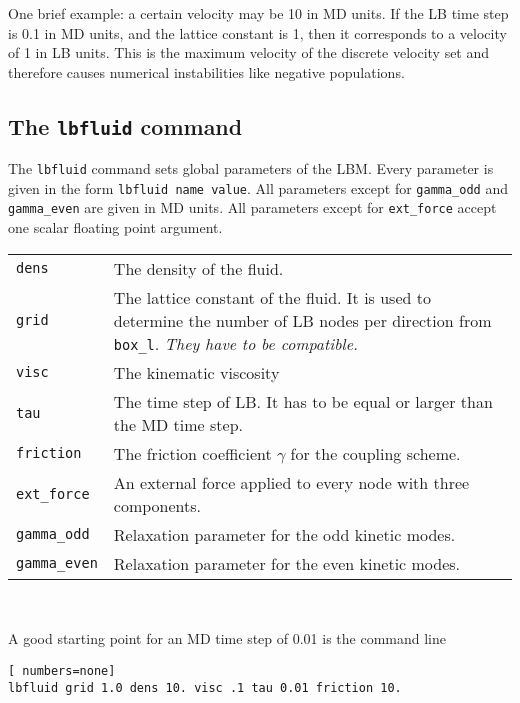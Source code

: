 One brief example: a certain velocity may be 10 in MD units.
If the LB time step is 0.1 in MD units, and the lattice constant
is 1, then it corresponds to a velocity of 1 in LB units. 
This is the maximum velocity of the discrete velocity set and therefore
causes numerical instabilities like negative populations.

\subsection*{The \texttt{lbfluid} command}
The \texttt{lbfluid} command sets global parameters of the LBM. Every
parameter is given in the form \texttt{lbfluid name value}. 
All parameters except for \texttt{gamma\_odd} and  \texttt{gamma\_even}
are given in MD units. All parameters except for \texttt{ext\_force} accept
one scalar floating point argument. \\
\vspace{0,2cm}
\begin{tabular}{p{}p{}}
\texttt{dens} & The density of the fluid.\\
\texttt{grid} & The lattice constant of the fluid. It is used to determine the number of LB nodes 
per direction from \texttt{box\_l}. {\em They have to be compatible.} \\
\texttt{visc} & The kinematic viscosity \\
\texttt{tau} & The time step of LB. It has to be equal or larger than the MD time step. \\
\texttt{friction} & The friction coefficient $\gamma$ for the coupling scheme. \\
\texttt{ext\_force} & An external force applied to every node with three components. \\
\texttt{gamma\_odd} & Relaxation parameter for the odd kinetic modes. \\
\texttt{gamma\_even} & Relaxation parameter for the even kinetic modes.
\end{tabular} \\
\vspace{0,2cm}

A good starting point for an MD time step of 0.01 is the command line
\vspace{0,2cm}
\begin{lstlisting}[ numbers=none]
lbfluid grid 1.0 dens 10. visc .1 tau 0.01 friction 10.
\end{lstlisting}
\vspace{0,2cm}

